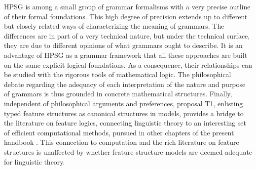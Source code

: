 \documentclass[output=paper,biblatex,babelshorthands,newtxmath,draftmode,colorlinks,citecolor=brown]{langscibook}
\begin{document}
{HPSG is among a small group of grammar formalisms with a very precise
outline of their formal foundations. This high degree of precision
extends up to different but closely related ways of characterizing the
meaning of grammars. The differences are in part of a very technical nature,
but under the technical surface, they are due to different opinions of
what grammars ought to describe. It is an advantage of HPSG as a
grammar framework that all these approaches are built on the same
explicit logical foundations. As a consequence, their relationships can
be studied with the rigorous tools of mathematical logic. The
philosophical debate regarding the adequacy of each interpretation of
the nature and purpose of grammars is thus grounded in concrete
mathematical structures. Finally, independent of 
philosophical arguments and preferences, proposal T1, enlisting typed feature
structures as canonical structures in models, provides a bridge to the
literature on feature logics, connecting linguistic theory to an
interesting set of efficient computational methods, pursued in other
chapters of the present handbook . This connection
to computation and the rich literature on feature structures is unaffected
by whether feature structure models are deemed adequate for linguistic theory.




}


\end{document}
